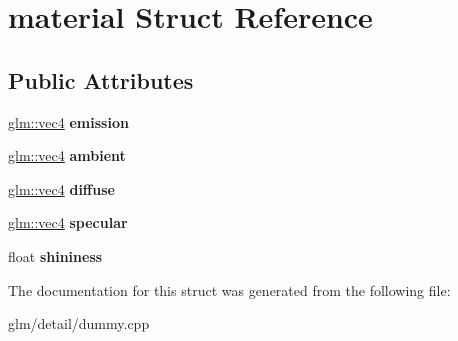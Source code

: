 \hypertarget{structmaterial}{\section{material Struct Reference}
\label{structmaterial}
}
\subsection*{Public Attributes}
\begin{DoxyCompactItemize}
\item 
\hypertarget{structmaterial_a76b696726a2ea73e6840001821942bc3}{\hyperlink{group__core__types_ga5881b1b022d7fd1b7218f5916532dd02}{glm\-::vec4} {\bfseries emission}}\label{structmaterial_a76b696726a2ea73e6840001821942bc3}

\item 
\hypertarget{structmaterial_a944296102e90b1610967530458f40ba1}{\hyperlink{group__core__types_ga5881b1b022d7fd1b7218f5916532dd02}{glm\-::vec4} {\bfseries ambient}}\label{structmaterial_a944296102e90b1610967530458f40ba1}

\item 
\hypertarget{structmaterial_a506a0cc33282fa76872c6aeebd688b39}{\hyperlink{group__core__types_ga5881b1b022d7fd1b7218f5916532dd02}{glm\-::vec4} {\bfseries diffuse}}\label{structmaterial_a506a0cc33282fa76872c6aeebd688b39}

\item 
\hypertarget{structmaterial_a452d07b4570da7204caeaf798cd01a77}{\hyperlink{group__core__types_ga5881b1b022d7fd1b7218f5916532dd02}{glm\-::vec4} {\bfseries specular}}\label{structmaterial_a452d07b4570da7204caeaf798cd01a77}

\item 
\hypertarget{structmaterial_aa3740fd7908ec5a11bbc4a4bd5b21abc}{float {\bfseries shininess}}\label{structmaterial_aa3740fd7908ec5a11bbc4a4bd5b21abc}

\end{DoxyCompactItemize}


The documentation for this struct was generated from the following file\-:\begin{DoxyCompactItemize}
\item 
glm/detail/dummy.\-cpp\end{DoxyCompactItemize}
